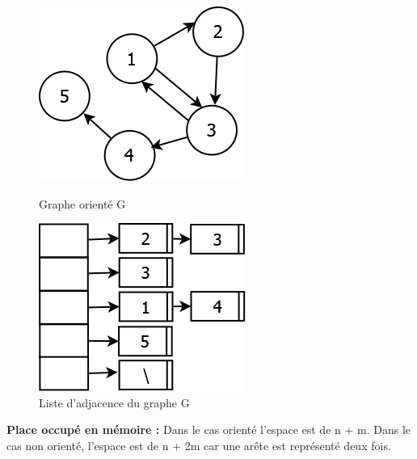 \begin{figure}[H]
	\begin{minipage}[c]{.46\linewidth}
	\begin{center}
		\includegraphics[height=100 pt, width=110 pt]{./ressources/image/graphAdjace.png} 
		\caption{Graphe orienté G}
		\label{grapAdjac2}
	\end{center}
	\end{minipage} 
	\begin{minipage}[c]{.46\linewidth}
	\begin{center}
		\includegraphics[height=110 pt, width=140 pt]{./ressources/image/listeAdjace.png} 
		\caption{Liste d'adjacence du graphe G}
		\label{listeAdjac}
	\end{center}
	\end{minipage} 
\end{figure}


\textbf{Place occupé en mémoire :} Dans le cas orienté l'espace est de n + m. Dans le cas non orienté, l'espace est de n + 2m car une arête est représenté deux fois.